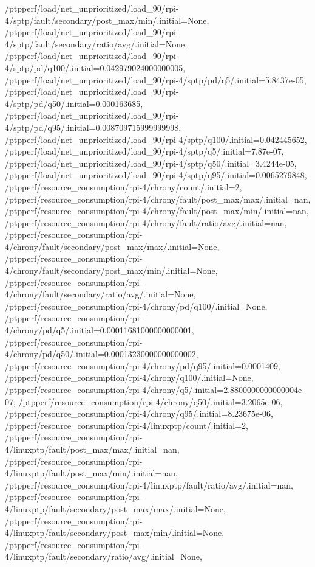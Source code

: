 {    /ptpperf/load/net_unprioritized/load_90/rpi-4/sptp/fault/secondary/post_max/min/.initial=None,
    /ptpperf/load/net_unprioritized/load_90/rpi-4/sptp/fault/secondary/ratio/avg/.initial=None,
    /ptpperf/load/net_unprioritized/load_90/rpi-4/sptp/pd/q100/.initial=0.042979024000000005,
    /ptpperf/load/net_unprioritized/load_90/rpi-4/sptp/pd/q5/.initial=5.8437e-05,
    /ptpperf/load/net_unprioritized/load_90/rpi-4/sptp/pd/q50/.initial=0.000163685,
    /ptpperf/load/net_unprioritized/load_90/rpi-4/sptp/pd/q95/.initial=0.008709715999999998,
    /ptpperf/load/net_unprioritized/load_90/rpi-4/sptp/q100/.initial=0.042445652,
    /ptpperf/load/net_unprioritized/load_90/rpi-4/sptp/q5/.initial=7.87e-07,
    /ptpperf/load/net_unprioritized/load_90/rpi-4/sptp/q50/.initial=3.4244e-05,
    /ptpperf/load/net_unprioritized/load_90/rpi-4/sptp/q95/.initial=0.0065279848,
    /ptpperf/resource_consumption/rpi-4/chrony/count/.initial=2,
    /ptpperf/resource_consumption/rpi-4/chrony/fault/post_max/max/.initial=nan,
    /ptpperf/resource_consumption/rpi-4/chrony/fault/post_max/min/.initial=nan,
    /ptpperf/resource_consumption/rpi-4/chrony/fault/ratio/avg/.initial=nan,
    /ptpperf/resource_consumption/rpi-4/chrony/fault/secondary/post_max/max/.initial=None,
    /ptpperf/resource_consumption/rpi-4/chrony/fault/secondary/post_max/min/.initial=None,
    /ptpperf/resource_consumption/rpi-4/chrony/fault/secondary/ratio/avg/.initial=None,
    /ptpperf/resource_consumption/rpi-4/chrony/pd/q100/.initial=None,
    /ptpperf/resource_consumption/rpi-4/chrony/pd/q5/.initial=0.00011681000000000001,
    /ptpperf/resource_consumption/rpi-4/chrony/pd/q50/.initial=0.00013230000000000002,
    /ptpperf/resource_consumption/rpi-4/chrony/pd/q95/.initial=0.0001409,
    /ptpperf/resource_consumption/rpi-4/chrony/q100/.initial=None,
    /ptpperf/resource_consumption/rpi-4/chrony/q5/.initial=2.8800000000000004e-07,
    /ptpperf/resource_consumption/rpi-4/chrony/q50/.initial=3.2065e-06,
    /ptpperf/resource_consumption/rpi-4/chrony/q95/.initial=8.23675e-06,
    /ptpperf/resource_consumption/rpi-4/linuxptp/count/.initial=2,
    /ptpperf/resource_consumption/rpi-4/linuxptp/fault/post_max/max/.initial=nan,
    /ptpperf/resource_consumption/rpi-4/linuxptp/fault/post_max/min/.initial=nan,
    /ptpperf/resource_consumption/rpi-4/linuxptp/fault/ratio/avg/.initial=nan,
    /ptpperf/resource_consumption/rpi-4/linuxptp/fault/secondary/post_max/max/.initial=None,
    /ptpperf/resource_consumption/rpi-4/linuxptp/fault/secondary/post_max/min/.initial=None,
    /ptpperf/resource_consumption/rpi-4/linuxptp/fault/secondary/ratio/avg/.initial=None,
}

